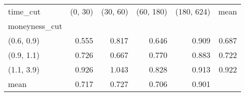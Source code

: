 \begin{tabular}{lrrrrr}
\toprule
time\_cut &  (0, 30) &  (30, 60) &  (60, 180) &  (180, 624) &  mean \\
moneyness\_cut &          &           &            &             &       \\
\midrule
(0.6, 0.9)    &    0.555 &     0.817 &      0.646 &       0.909 & 0.687 \\
(0.9, 1.1)    &    0.726 &     0.667 &      0.770 &       0.883 & 0.722 \\
(1.1, 3.9)    &    0.926 &     1.043 &      0.828 &       0.913 & 0.922 \\
mean          &    0.717 &     0.727 &      0.706 &       0.901 &       \\
\bottomrule
\end{tabular}
